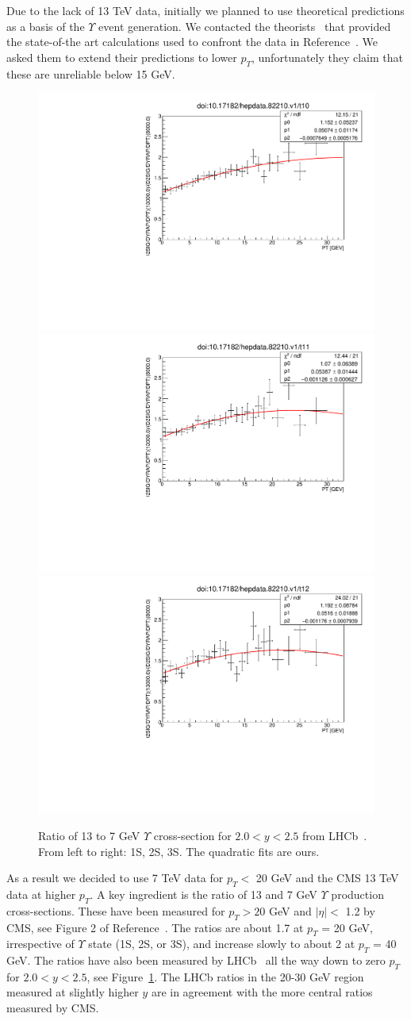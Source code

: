 \documentclass[12pt]{article}
\begin{document}
  Due to the lack of 13 TeV data, initially we planned to use theoretical predictions
  as a basis of the $\Upsilon$ event generation.
  We contacted the theorists~\cite{Han:2014kxa}
  that provided the state-of-the art calculations used to
  confront the data in Reference~\cite{Sirunyan:2017qdw}.  We
  asked them to extend their predictions to lower $p_T$, unfortunately they claim that these
  are unreliable below 15 GeV.

\begin{figure}
\begin{adjustwidth}{-2cm}{-2cm}
\centering
\includegraphics[width=0.32\linewidth]{../oniaDirect/LHCB-13-TeV/ups1s-13to7eta20to25.pdf}
\includegraphics[width=0.32\linewidth]{../oniaDirect/LHCB-13-TeV/ups2s-13to7eta20to25.pdf}
\includegraphics[width=0.32\linewidth]{../oniaDirect/LHCB-13-TeV/ups3s-13to7eta20to25.pdf}
\end{adjustwidth}
\caption{\protect Ratio of 13 to 7 GeV $\Upsilon$ cross-section for $2.0 < y < 2.5$
  from LHCb~\cite{Aaij:2018pfp}.  From left to right: 1S, 2S, 3S. 
  The quadratic fits are ours.}
\label{fig:upsratio}
\end{figure}


  
  As a result we decided to use 7 TeV data for $p_T <$ 20 GeV and the CMS
  13 TeV data at higher $p_T$.  A key ingredient is the ratio of 13 and 7
  GeV $\Upsilon$ production cross-sections.  These have been measured
  for $p_T > 20$ GeV and $|\eta| <$ 1.2 by CMS,
  see Figure 2 of Reference~\cite{Sirunyan:2017qdw}. The ratios
  are about 1.7 at $p_T$ = 20 GeV, irrespective of $\Upsilon$ state
  (1S, 2S, or 3S), and increase slowly to about 2
  at $p_T$ = 40 GeV.  The ratios have also been measured by
  LHCb~\cite{Aaij:2018pfp}
  all the way down to zero $p_T$ for $2.0 < y < 2.5$, see Figure~\ref{fig:upsratio}.
  The LHCb ratios in the 20-30 GeV region measured at slightly higher
  $y$ are in agreement with the more central
  ratios measured by CMS.
\end{document}
